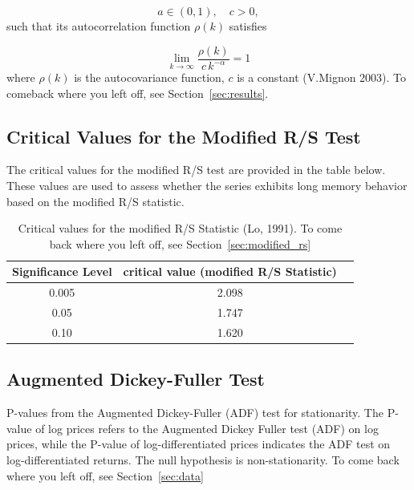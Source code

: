 \documentclass[11pt]{extarticle}
\begin{document}
\[
a\in(0,1),\quad c>0,
\]
such that its autocorrelation function \(\rho(k)\) satisfies

\begin{equation}
\lim_{k \to \infty}
\frac{\rho(k)}{c\,k^{-\alpha}}
=1
\end{equation}
where \(\rho(k)\) is the autocovariance function, \(c\) is a constant (V.Mignon 2003). To comeback where you left off,
see Section~\ref{sec:results}.

\subsection{Critical Values for the Modified R/S Test}

The critical values for the modified R/S test are provided in the table below. These values are used to assess whether the series exhibits long memory behavior based on the modified R/S statistic.

\begin{table}[ht!]
\centering
\begin{tabular}{|c|c|c|}
\hline
\textbf{Significance Level} & \textbf{critical value (modified R/S Statistic)} \\
\hline
0.005 & 2.098\\
0.05 & 1.747\\
0.10 & 1.620\\

\hline
\end{tabular}
\caption{Critical values for the modified R/S Statistic (Lo, 1991). To come back where you left off, see Section~\ref{sec:modified_rs}}
    \label{table:critical_values}
\end{table}

\FloatBarrier

\subsection{Augmented Dickey-Fuller Test}

\begin{table}[h!]
    \centering
    \caption{P-values from the Augmented Dickey-Fuller (ADF) test for stationarity. The P-value of log prices refers to the Augmented Dickey Fuller test (ADF) on log prices,
     while the P-value of log-differentiated prices indicates the ADF test on log-differentiated returns. The null hypothesis is non-stationarity.
    To come back where you left off, see Section~\ref{sec:data}}
    \label{table:adf_results}
\end{table}
\end{document}
